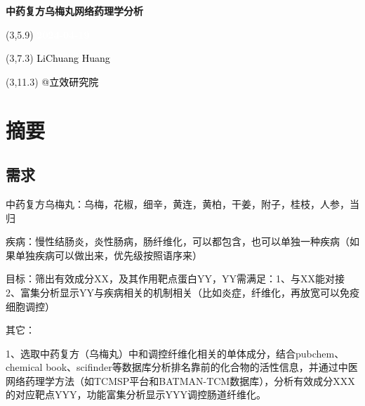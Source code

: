 \documentclass[
]{article}
\author{}
\date{\vspace{-2.5em}}
\begin{document}
\begin{titlepage} 
\begin{center} \textbf{\Huge
中药复方乌梅丸网络药理学分析} \vspace{4em}
\begin{textblock}{10}(3,5.9) \huge
\textbf{\textcolor{white}{2024-04-19}}
\end{textblock} \begin{textblock}{10}(3,7.3)
\Large \textcolor{black}{LiChuang Huang}
\end{textblock} \begin{textblock}{10}(3,11.3)
\Large \textcolor{black}{@立效研究院}
\end{textblock} \end{center} \end{titlepage}
\restoregeometry


\tableofcontents

\listoffigures

\listoftables

\newpage


\hypertarget{abstract}{%
\section{摘要}\label{abstract}}

\hypertarget{ux9700ux6c42}{%
\subsection{需求}\label{ux9700ux6c42}}

中药复方乌梅丸：乌梅，花椒，细辛，黄连，黄柏，干姜，附子，桂枝，人参，当归

疾病：慢性结肠炎，炎性肠病，肠纤维化，可以都包含，也可以单独一种疾病（如果单独疾病可以做出来，优先级按照语序来）

目标：筛出有效成分XX，及其作用靶点蛋白YY，YY需满足：1、与XX能对接 2、富集分析显示YY与疾病相关的机制相关（比如炎症，纤维化，再放宽可以免疫细胞调控）

其它：

1、选取中药复方（乌梅丸）中和调控纤维化相关的单体成分，结合pubchem、chemical book、scifinder等数据库分析排名靠前的化合物的活性信息，并通过中医网络药理学方法（如TCMSP平台和BATMAN-TCM数据库），分析有效成分XXX的对应靶点YYY，功能富集分析显示YYY调控肠道纤维化。
\end{document}
